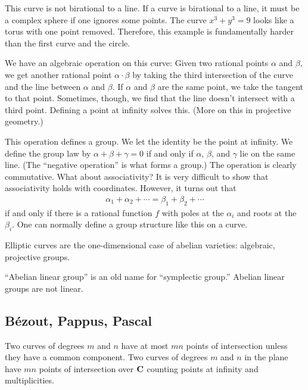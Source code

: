 \documentclass [11 pt, oneside] {article}
\begin{document}
This curve is not birational to a line. If a curve is birational to a line, it must be a complex sphere if one ignores some points. The curve $x^3 + y^3 =9$ looks like a torus with one point removed. Therefore, this example is fundamentally harder than the first curve and the circle.

We have an algebraic operation on this curve: Given two rational points $\alpha$ and $\beta$, we get another rational point $\alpha\cdot \beta$ by taking the third intersection of the curve and the line between $\alpha$ and $\beta$. If $\alpha$ and $\beta$ are the same point, we take the tangent to that point. Sometimes, though, we find that the line doesn't intersect with a third point. Defining a point at infinity solves this. (More on this in projective geometry.)

This operation defines a group. We let the identity be the point at infinity. We define the group law by $\alpha+\beta+\gamma = 0$ if and only if $\alpha$, $\beta$, and $\gamma$ lie on the same line. (The ``negative operation'' is what forms a group.) The operation is clearly commutative. What about associativity? It is very difficult to show that associativity holds with coordinates. However, it turns out that
\begin{align*}
	\alpha_1+\alpha_2+\cdots = \beta_1+\beta_2+\cdots
\end{align*}
if and only if there is a rational function $f$ with poles at the $\alpha_i$ and roots at the $\beta_i$. One can normally define a group structure like this on a curve.

Elliptic curves are the one-dimensional case of abelian varieties: algebraic, projective groups.
\begin{warn}
	``Abelian linear group'' is an old name for ``symplectic group.'' Abelian linear groups are not linear.
\end{warn}

\subsection{B\'ezout, Pappus, Pascal}
\label{s_3}

\begin{theorem}
	\label{}
Two curves of degrees $m$ and $n$ have at most $mn$ points of intersection unless they have a common component. Two curves of degrees $m$ and $n$ in the plane have $mn$ points of intersection over $\mathbf C$ counting points at infinity and multiplicities.
\end{theorem}
\end{document}
